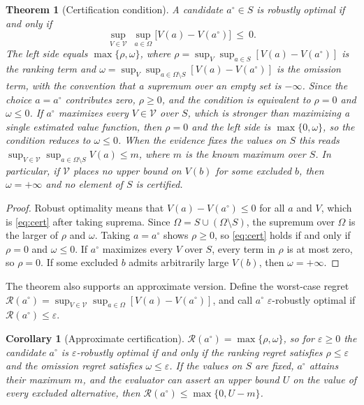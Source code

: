 \documentclass[11pt]{article}
\newtheorem{theorem}{Theorem}
\newtheorem{corollary}{Corollary}
\theoremstyle{definition}
\theoremstyle{remark}
\begin{document}
\begin{theorem}[Certification condition]
\label{thm:cert}
A candidate $a^{\circ}\in S$ is robustly optimal if and only if
\begin{equation}
\sup_{V\in\mathcal V}\ \sup_{a\in\Omega}\big[V(a)-V(a^{\circ})\big]\ \le\ 0.
\label{eq:cert}
\end{equation}
The left side equals $\max\{\rho,\omega\}$, where $\rho=\sup_{V}\sup_{a\in S}[V(a)-V(a^{\circ})]$ is the ranking term and $\omega=\sup_{V}\sup_{a\in\Omega\setminus S}[V(a)-V(a^{\circ})]$ is the omission term, with the convention that a supremum over an empty set is $-\infty$. Since the choice $a=a^{\circ}$ contributes zero, $\rho\ge0$, and the condition is equivalent to $\rho=0$ and $\omega\le0$. If $a^{\circ}$ maximizes every $V\in\mathcal V$ over $S$, which is stronger than maximizing a single estimated value function, then $\rho=0$ and the left side is $\max\{0,\omega\}$, so the condition reduces to $\omega\le0$. When the evidence fixes the values on $S$ this reads $\sup_{V\in\mathcal V}\sup_{a\in\Omega\setminus S}V(a)\le m$, where $m$ is the known maximum over $S$. In particular, if $\mathcal V$ places no upper bound on $V(b)$ for some excluded $b$, then $\omega=+\infty$ and no element of $S$ is certified.
\end{theorem}

\begin{proof}
Robust optimality means that $V(a)-V(a^{\circ})\le0$ for all $a$ and $V$, which is \eqref{eq:cert} after taking suprema. Since $\Omega=S\cup(\Omega\setminus S)$, the supremum over $\Omega$ is the larger of $\rho$ and $\omega$. Taking $a=a^{\circ}$ shows $\rho\ge0$, so \eqref{eq:cert} holds if and only if $\rho=0$ and $\omega\le0$. If $a^{\circ}$ maximizes every $V$ over $S$, every term in $\rho$ is at most zero, so $\rho=0$. If some excluded $b$ admits arbitrarily large $V(b)$, then $\omega=+\infty$.
\end{proof}

The theorem also supports an approximate version. Define the worst-case regret $\mathcal R(a^{\circ})=\sup_{V\in\mathcal V}\sup_{a\in\Omega}[V(a)-V(a^{\circ})]$, and call $a^{\circ}$ $\varepsilon$-robustly optimal if $\mathcal R(a^{\circ})\le\varepsilon$.

\begin{corollary}[Approximate certification]
\label{cor:approx}
$\mathcal R(a^{\circ})=\max\{\rho,\omega\}$, so for $\varepsilon\ge0$ the candidate $a^{\circ}$ is $\varepsilon$-robustly optimal if and only if the ranking regret satisfies $\rho\le\varepsilon$ and the omission regret satisfies $\omega\le\varepsilon$. If the values on $S$ are fixed, $a^{\circ}$ attains their maximum $m$, and the evaluator can assert an upper bound $U$ on the value of every excluded alternative, then $\mathcal R(a^{\circ})\le\max\{0,U-m\}$.
\end{corollary}
\end{document}
